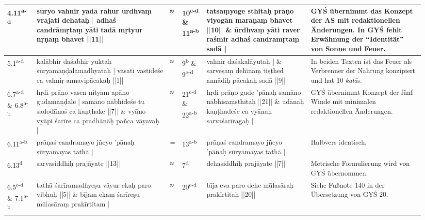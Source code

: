 \documentclass[a4paper,12pt]{article}
\begin{document}
{\begin{tabularx}{\textwidth}{p{}|p{}|p{}|p{}|p{}|p{}}
\hline
4.11\textsuperscript{a-d} & sūryo vahnir yadā rāhur ūrdhvaṃ vrajati dehataḥ | adhaś candrāmṛtaṃ yāti tadā mṛtyur nṛṇāṃ bhavet ||11|| & ≈ & 10\textsuperscript{c-d} \& 11\textsuperscript{a-b} & tatsaṃyoge sthitaḥ prāṇo viyogān maraṇaṃ bhavet ||10|| \newline \& \newline ūrdhvaṃ yāti raver raśmir adhaś candrāmṛtaṃ sadā | & GYŚ übernimmt das Konzept der AS mit redaktionellen Änderungen. In GYŚ fehlt Erwähnung der ``Identität'' von Sonne und Feuer.  \\

\hline
5.1\textsuperscript{a-d} & kalābhir daśabhir yuktaḥ sūryamaṇḍalamadhyataḥ | vasati vastideśe ca vahniṛ annavipācakaḥ ||1||& ≈ & 9\textsuperscript{b} \& 9\textsuperscript{c-d} & vahnir daśakalāyutaḥ | \newline \& \newline sarveṣāṃ dehināṃ tiṣṭhed annādiḥ pācakaḥ sadā ||9|| & In beiden Texten ist das Feuer als Verbrenner der Nahrung konzipiert und hat 10 \textit{kalā}s. \\

\hline
6.7\textsuperscript{a-d} \& 6.8\textsuperscript{a-b} & hṛdi prāṇo vasen nityam apāno gudamaṇḍale | samāno nābhideśe tu sadodānaś ca kaṇṭhake ||7|| \newline \& \newline vyāno vyāpi śarīre ca pradhānāḥ pañca vāyavaḥ | & ≈ & 21\textsuperscript{c-d} \& 22\textsuperscript{a-b} & hṛdi prāṇo gude ’pānaḥ samāno nābhisaṃsthitaḥ ||21|| \newline \& \newline udānaḥ kaṇṭhadeśe ca vyānaḥ sarvaśarīragaḥ | & GYŚ übernimmt Konzept der fünf Winde mit minimalen redaktionellen Änderungen. \\

\hline
6.11\textsuperscript{a-b} & prāṇaś candramayo jñeyo ’pānaḥ sūryamayas tathā | & = & 13\textsuperscript{a-b} & prāṇaś candramayo jñeyo ’pānaḥ sūryamayas tathā | & Halbvers identisch. \\

\hline
6.13\textsuperscript{d} & sarvasiddhiḥ prajāyate ||13|| & ≈ & 7\textsuperscript{d} & dehasiddhiḥ prajāyate ||7|| & Metrische Formulierung wird von GYŚ übernommen. \\

\hline
6.5\textsuperscript{c-d} \& 7.1\textsuperscript{a-b} & tathā śarīramadhyeṣu vāyur ekaḥ paro vibhuḥ ||5|| \newline \& \newline bījam ekaṃ śarīreṣu mūlasāraṃ prakīrtitam | & ≈ & 20\textsuperscript{c-d} & bīja eva paro dehe mūlasāraḥ prakīrtitaḥ ||20|| & Siehe Fußnote 140 in der Übersetzung von GYŚ 20. \\


\end{tabularx}}
\end{document}
